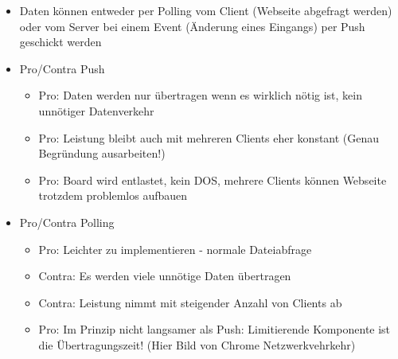 \begin{itemize}
	\item Daten können entweder per Polling vom Client (Webseite abgefragt werden) oder
		  vom Server bei einem Event (Änderung eines Eingangs) per Push geschickt werden	  
	\item Pro/Contra Push
	\begin{itemize}
		\item Pro: Daten werden nur übertragen wenn es wirklich nötig ist, kein unnötiger 
			  Datenverkehr
		\item Pro: Leistung bleibt auch mit mehreren Clients eher konstant 
			  (Genau Begründung ausarbeiten!)
		\item Pro: Board wird entlastet, kein DOS, mehrere Clients können Webseite 
		      trotzdem problemlos aufbauen 
	\end{itemize}
	\item Pro/Contra Polling
	\begin{itemize}
		\item Pro: Leichter zu implementieren - normale Dateiabfrage
		\item Contra: Es werden viele unnötige Daten übertragen
		\item Contra: Leistung nimmt mit steigender Anzahl von Clients ab
		\item Pro: Im Prinzip nicht langsamer als Push: Limitierende Komponente ist die 
			  Übertragungszeit! (Hier Bild von Chrome Netzwerkvehrkehr) 
	\end{itemize}
	

\end{itemize}

